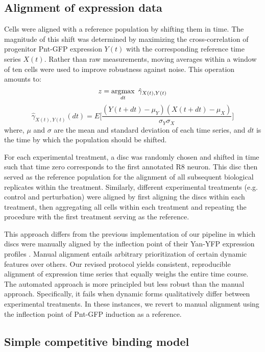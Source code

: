 \subsection{Alignment of expression data}
\label{appendix:methods:ratio:alignment}

Cells were aligned with a reference population by shifting them in time. The magnitude of this shift was determined by maximizing the cross-correlation of progenitor Pnt-GFP expression $Y(t)$ with the corresponding reference time series $X(t)$. Rather than raw measurements, moving averages within a window of ten cells were used to improve robustness against noise. This operation amounts to:
\begin{equation}
z = \argmax_{dt} \ {\hat{\gamma}_{X(t),Y(t)}}
\end{equation}
\begin{equation}
\hat{\gamma}_{X(t),Y(t)} (dt) = E \Big[ \frac{(Y(t+dt)-\mu_Y)(X(t+dt)-\mu_X)}{\sigma_Y \sigma_X} \Big]
\end{equation}
where, $\mu$ and $\sigma$ are the mean and standard deviation of each time series, and $dt$ is the time by which the population should be shifted.

For each experimental treatment, a disc was randomly chosen and shifted in time such that time zero corresponds to the first annotated R8 neuron. This disc then served as the reference population for the alignment of all subsequent biological replicates within the treatment. Similarly, different experimental treatments (e.g. control and perturbation) were aligned by first aligning the discs within each treatment, then aggregating all cells within each treatment and repeating the procedure with the first treatment serving as the reference.

This approach differs from the previous implementation of our pipeline in which discs were manually aligned by the inflection point of their Yan-YFP expression profiles \cite{Pelaez2015a}. Manual alignment entails arbitrary prioritization of certain dynamic features over others. Our revised protocol yields consistent, reproducible alignment of expression time series that equally weighs the entire time course. The automated approach is more principled but less robust than the manual approach. Specifically, it fails when dynamic forms qualitatively differ between experimental treatments. In these instances, we revert to manual alignment using the inflection point of Pnt-GFP induction as a reference.

\subsection{Simple competitive binding model}
\label{appendix:methods:ratio:simple_model}


